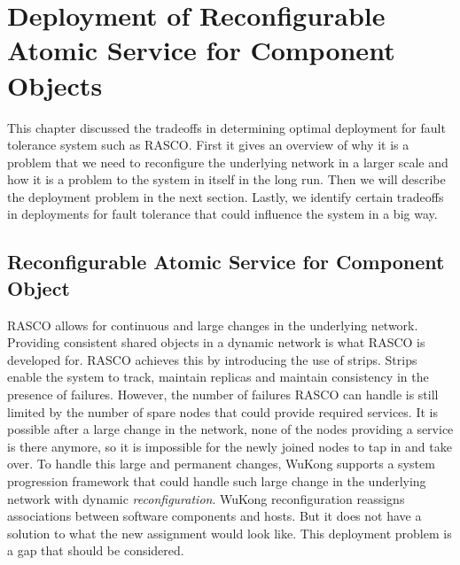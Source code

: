 \cleardoublepage
\singlespacing
\chapter{Deployment of Reconfigurable Atomic Service for Component Objects}
\label{c:deploy}
\doublespacing\nointerlineskip

\begin{comment}
Niels:about the tradeoffs in determining the deployment from your fault
tolerance perspective
\end{comment}

This chapter discussed the tradeoffs in determining optimal deployment for fault tolerance system such as RASCO. First it gives an overview of why it is a problem that we need to reconfigure the underlying network in a larger scale and how it is a problem to the system in itself in the long run. Then we will describe the deployment problem in the next section. Lastly, we identify certain tradeoffs in deployments for fault tolerance that could influence the system in a big way.

\section{Reconfigurable Atomic Service for Component Object}

\begin{comment}
Niels suggested that I show that I am aware of such issue with determining
optimality for deployment which is not clear for WuKong yet, there are many
ways or metrics to optimize for, all I can do in this work is to identify some
tradeoffs certain deployment for fault tolerance could influence the system
with certain metrics.

Limits will be hard to define here
\end{comment}

RASCO allows for continuous and large changes in the underlying
network. Providing consistent shared objects in a dynamic network is what RASCO
is developed for. RASCO achieves this by introducing the use of strips. Strips
enable the system to track, maintain replicas and maintain consistency in the
presence of failures. However, the number of failures RASCO can handle is still
limited by the number of spare nodes that could provide required services. It is
possible after a large change in the network, none of the nodes providing
a service is there anymore, so it is impossible for the newly joined
nodes to tap in and take over. To handle this large and permanent changes,
WuKong supports a system progression framework that could handle such large
change in the underlying network with dynamic \emph{reconfiguration}. WuKong
reconfiguration reassigns associations between software components and hosts.
But it does not have a solution to what the new assignment would look like.
This deployment problem is a gap that should be considered.

